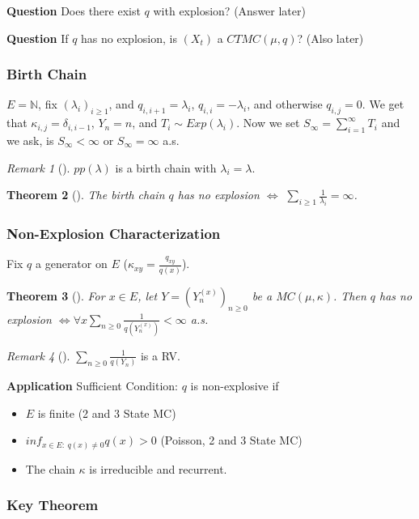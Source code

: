 \documentclass[12pt]{book}
\renewcommand{\iff}{\Leftrightarrow}
\newtheorem{theorem}{Theorem}[section]
\theoremstyle{definition}
\theoremstyle{remark}
\newtheorem{rmk}[theorem]{Remark}
\begin{document}
\textbf{Question} Does there exist $q$ with explosion? (Answer later)

\textbf{Question} If $q$ has no explosion, is $(X_t)$ a $CTMC(\mu, q)$? (Also later)

\subsubsection{Birth Chain}
$E= \mathbb{N}$, fix $(\lambda_i)_{i\geq 1}$, and $q_{i,i+1}= \lambda_i$, $q_{i,i}=-\lambda_i$, and otherwise $q_{i,j}=0$. We get that $\kappa_{i,j}= \delta_{i, i-1}$, $Y_n = n$, and $T_i \sim Exp(\lambda_i)$. Now we set $S_{\infty} = \sum_{i=1}^{\infty} T_i$ and we ask, is $S_\infty < \infty$ or $S_\infty = \infty$ a.s.

\begin{rmk}[]
	$pp(\lambda)$ is a birth chain with  $\lambda_i = \lambda$.
\end{rmk}

\begin{theorem}[]
	The birth chain $q$ has no explosion $\iff$ $\sum_{i\geq 1}^{} \frac{1}{\lambda_i} = \infty$.
\end{theorem}

\subsubsection{Non-Explosion Characterization} 
Fix $q$ a generator on $E$ ($\kappa_{xy}= \frac{q_{xy}}{q(x)}$).

\begin{theorem}[]
	For $x \in E$, let $Y=(Y_n^{(x)})_{n\geq 0}$ be a $MC(\mu, \kappa )$. Then $q$ has no explosion $\iff \forall x \sum_{n\geq 0}^{} \frac{1}{q(Y_n^{(x)})} < \infty $ a.s.
\end{theorem}

\begin{rmk}[]
	$ \sum_{n\geq 0}^{} \frac{1}{q(Y_n)}$ is a RV.
\end{rmk}
\noindent
\textbf{Application} Sufficient Condition: $q$ is non-explosive if
\begin{itemize}
	\item $E$ is finite (2 and 3 State MC)
	\item $inf_{x \in E:\ q(x) \neq 0}q(x) > 0 $ (Poisson, 2 and 3 State MC)
	\item The chain $\kappa $ is irreducible and recurrent.
\end{itemize}

\subsubsection{Key Theorem}
\end{document}
